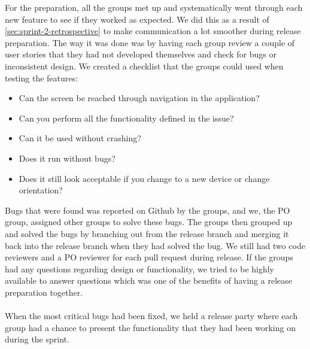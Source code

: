 For the preparation, all the groups met up and systematically went through each new feature to see if they worked as expected. We did this as a result of \autoref{sec:sprint-2-retrospective} to make communication a lot smoother during release preparation.
The way it was done was by having each group review a couple of user stories that they had not developed themselves and check for bugs or inconsistent design. 
We created a checklist that the groups could used when testing the features:
\begin{itemize}
    \item Can the screen be reached through navigation in the application?
    \item Can you perform all the functionality defined in the issue?
    \item Can it be used without crashing?
    \item Does it run without bugs?
    \item Does it still look acceptable if you change to a new device or change orientation?
\end{itemize}
Bugs that were found was reported on Github by the groups, and we, the PO group, assigned other groups to solve these bugs.
The groups then grouped up and solved the bugs by branching out from the release branch and merging it back into the release branch when they had solved the bug. 
We still had two code reviewers and a PO reviewer for each pull request during release. 
If the groups had any questions regarding design or functionality, we tried to be highly available to answer questions which was one of the benefits of having a release preparation together.
\\\\
When the most critical bugs had been fixed, we held a release party where each group had a chance to present the functionality that they had been working on during the sprint. 
